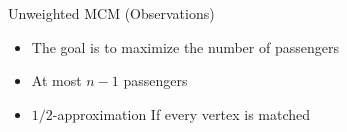 \begin{frame}{Unweighted MCM (Observations)}
\begin{itemize}
  \item<1> The goal is to maximize the number of passengers
  \item<2> At most $n - 1$ passengers
  \item<3> $1/2$-approximation If every vertex is matched 
\end{itemize}
\end{frame}